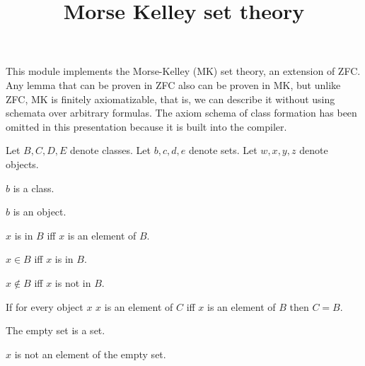 \documentclass{article}
\title{Morse Kelley set theory}
\author{}
\date{}
\begin{document}

  \maketitle

  This module implements the Morse-Kelley (MK) set theory,
  an extension of ZFC. Any lemma that can be proven in ZFC
  also can be proven in MK, but unlike ZFC, MK is finitely axiomatizable,
  that is, we can describe it without using schemata over arbitrary formulas.
  The axiom schema of class formation has been omitted in this presentation
  because it is built into the compiler.

  \begin{forthel}

    Let $B, C, D, E$ denote classes.
    Let $b, c, d, e$ denote sets.
    Let $w, x, y, z$ denote objects.

    \begin{axiom}
      $b$ is a class.
    \end{axiom}
    
    \begin{axiom}
      $b$ is an object.
    \end{axiom}

    \begin{definition}
      $x$ is in $B$ iff $x$ is an element of $B$.
    \end{definition}

    \begin{definition}
      $x \in B$ iff $x$ is in $B$.
    \end{definition}

    \begin{definition}
      $x \notin B$ iff $x$ is not in $B$.
    \end{definition}

    \begin{axiom}[Ext]
      If for every object $x$ $x$ is an element of $C$ iff $x$ is an element of $B$ then $C = B$.
    \end{axiom}

    \begin{signature}
      The empty set is a set.
    \end{signature}

    \begin{axiom}[Empty]
      $x$ is not an element of the empty set.
    \end{axiom}


\end{forthel}
\end{document}
